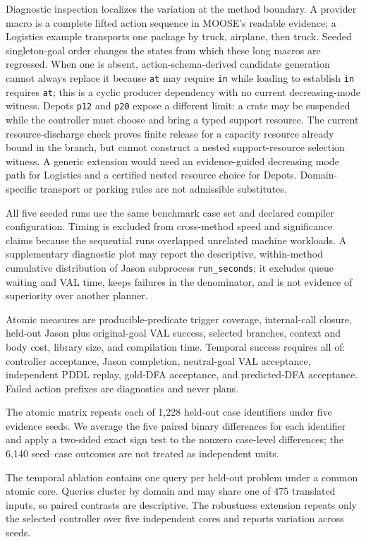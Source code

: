 Diagnostic inspection localizes the variation at the method boundary. A provider
macro is a
complete lifted action sequence in MOOSE's readable evidence; a Logistics
example transports one package by truck, airplane, then truck. Seeded
singleton-goal order changes the states from which these long macros are
regressed. When one is absent, action-schema-derived candidate generation cannot always
replace it because
\texttt{at} may require \texttt{in} while loading to establish \texttt{in}
requires \texttt{at}; this is a cyclic producer dependency with no current
decreasing-mode witness. Depots \texttt{p12} and \texttt{p20} expose a
different limit: a crate may be suspended while the controller must choose and
bring a typed support resource. The current resource-discharge check proves
finite release for a capacity resource already bound in the branch, but cannot
construct a nested support-resource selection witness. A generic extension would need an
evidence-guided decreasing mode path for Logistics and a certified nested
resource choice for Depots. Domain-specific transport or parking rules are not
admissible substitutes.

All five seeded runs use the same benchmark case set and declared compiler
configuration. Timing is excluded from cross-method speed and
significance claims because the sequential runs overlapped unrelated machine
workloads. A supplementary diagnostic plot may report the descriptive,
within-method cumulative distribution of Jason subprocess
\texttt{run\_seconds}; it excludes queue waiting and VAL time, keeps failures
in the denominator, and is not evidence of superiority over another planner.

Atomic measures are producible-predicate trigger coverage, internal-call closure,
held-out Jason plus original-goal VAL success, selected branches, context and
body cost, library size, and compilation time. Temporal success requires all
of: controller acceptance, Jason completion, neutral-goal VAL acceptance,
independent PDDL replay, gold-DFA acceptance, and predicted-DFA acceptance.
Failed action prefixes are diagnostics and never plans.

The atomic matrix repeats each of 1,228 held-out case identifiers under five
evidence seeds. We average the five paired binary differences for each identifier
and apply a two-sided exact sign test to the nonzero case-level differences;
the 6,140 seed--case outcomes are not treated as independent units.

The temporal ablation contains one query per held-out problem under a common
atomic core. Queries cluster by domain and may share one of 475 translated
inputs, so paired contrasts are descriptive. The robustness extension repeats
only the selected controller over five independent cores and reports variation
across seeds.

